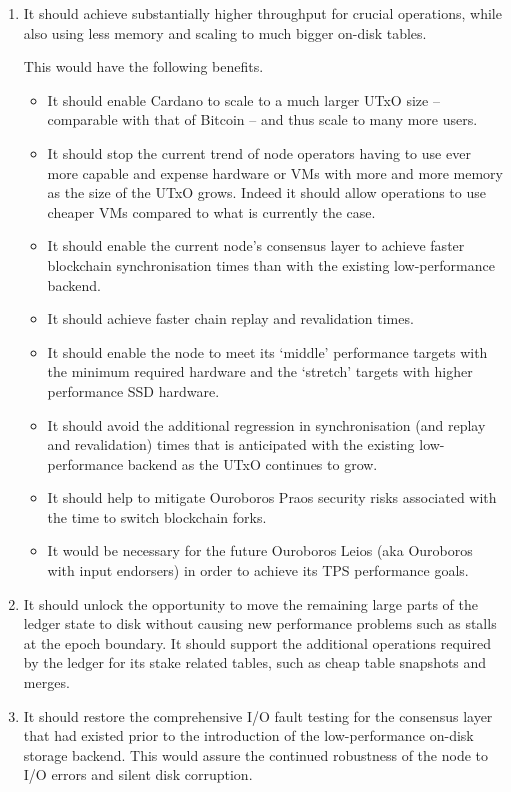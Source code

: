 \documentclass[11pt,a4paper]{article}
\begin{document}
\begin{enumerate}
\item It should achieve substantially higher throughput for crucial operations,
      while also using less memory and scaling to much bigger on-disk tables.

      This would have the following benefits.
      \begin{itemize}
      \item It should enable Cardano to scale to a much larger UTxO size --
            comparable with that of Bitcoin -- and thus scale to many more
            users.
      \item It should stop the current trend of node operators having to use
            ever more capable and expense hardware or VMs with more and more
            memory as the size of the UTxO grows. Indeed it should allow
            operations to use cheaper VMs compared to what is currently the case.
      \item It should enable the current node's consensus layer to achieve
            faster blockchain synchronisation times than with the existing
            low-performance backend.
      \item It should achieve faster chain replay and revalidation times.
      \item It should enable the node to meet its `middle' performance targets
            with the minimum required hardware and the `stretch' targets with
            higher performance SSD hardware.
      \item It should avoid the additional regression in synchronisation (and
            replay and revalidation) times that is anticipated with the
            existing low-performance backend as the UTxO continues to grow.
      \item It should help to mitigate Ouroboros Praos security risks
            associated with the time to switch blockchain forks.
      \item It would be necessary for the future Ouroboros Leios (aka Ouroboros
            with input endorsers) in order to achieve its TPS performance goals.
      \end{itemize}

\item It should unlock the opportunity to move the remaining large parts of the
      ledger state to disk without causing new performance problems such as
      stalls at the epoch boundary. It should support the additional operations
      required by the ledger for its stake related tables, such as cheap
      table snapshots and merges.

\item It should restore the comprehensive I/O fault testing for the consensus
      layer that had existed prior to the introduction of the
      low-performance on-disk storage backend. This would assure the
      continued robustness of the node to I/O errors and silent disk corruption.
\end{enumerate}
\end{document}
